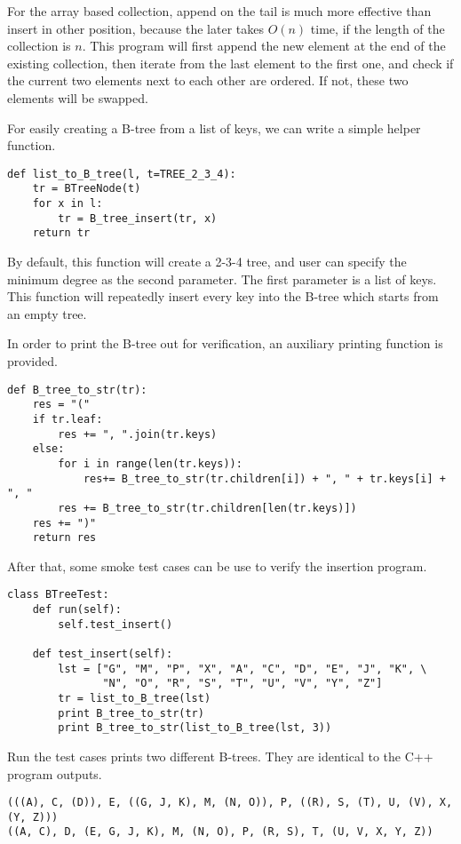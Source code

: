 \documentclass{article}
\begin{document}
For the array based collection, append on the tail is much more effective than
insert in other position, because the later takes $O(n)$ time, if the length
of the collection is $n$. This program will first append the new element at
the end of the existing collection, then iterate from the last element to
the first one, and check if the current two elements next to each other
are ordered. If not, these two elements will be swapped.

For easily creating a B-tree from a list of keys, we can write a simple helper
function.

\begin{lstlisting}
def list_to_B_tree(l, t=TREE_2_3_4):
    tr = BTreeNode(t)
    for x in l:
        tr = B_tree_insert(tr, x)
    return tr
\end{lstlisting}

By default, this function will create a 2-3-4 tree, and user can specify the
minimum degree as the second parameter. The first parameter is a list of keys.
This function will repeatedly insert every key into the B-tree which starts
from an empty tree.

In order to print the B-tree out for verification, an auxiliary printing
function is provided.

\begin{lstlisting}
def B_tree_to_str(tr):
    res = "("
    if tr.leaf:
        res += ", ".join(tr.keys)
    else:
        for i in range(len(tr.keys)):
            res+= B_tree_to_str(tr.children[i]) + ", " + tr.keys[i] + ", "
        res += B_tree_to_str(tr.children[len(tr.keys)])
    res += ")"
    return res
\end{lstlisting}

After that, some smoke test cases can be use to verify the insertion
program.

\begin{lstlisting}
class BTreeTest:
    def run(self):
        self.test_insert()

    def test_insert(self):
        lst = ["G", "M", "P", "X", "A", "C", "D", "E", "J", "K", \
               "N", "O", "R", "S", "T", "U", "V", "Y", "Z"]
        tr = list_to_B_tree(lst)
        print B_tree_to_str(tr)
        print B_tree_to_str(list_to_B_tree(lst, 3))
\end{lstlisting}

Run the test cases prints two different B-trees. They are identical
to the C++ program outputs.

\begin{verbatim}
(((A), C, (D)), E, ((G, J, K), M, (N, O)), P, ((R), S, (T), U, (V), X, (Y, Z)))
((A, C), D, (E, G, J, K), M, (N, O), P, (R, S), T, (U, V, X, Y, Z))
\end{verbatim}
\end{document}
